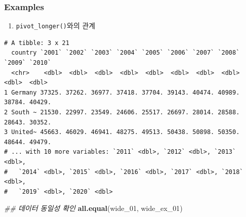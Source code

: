 \documentclass[
  11pt,
]{krantz}
\newenvironment{Shaded}{\begin{snugshade}}{\end{snugshade}}
\newcommand{\CommentTok}[1]{\textcolor[rgb]{0.37,0.37,0.37}{\textit{#1}}}
\newcommand{\DataTypeTok}[1]{\textcolor[rgb]{0.27,0.27,0.27}{#1}}
\newcommand{\DecValTok}[1]{\textcolor[rgb]{0.06,0.06,0.06}{#1}}
\newcommand{\KeywordTok}[1]{\textcolor[rgb]{0.27,0.27,0.27}{\textbf{#1}}}
\newcommand{\NormalTok}[1]{#1}
\newcommand{\OperatorTok}[1]{\textcolor[rgb]{0.43,0.43,0.43}{\textbf{#1}}}
\newcommand{\StringTok}[1]{\textcolor[rgb]{0.5,0.5,0.5}{#1}}
\providecommand{\tightlist}{%
  \setlength{\itemsep}{0pt}\setlength{\parskip}{0pt}}
\begin{document}
\normalsize

\hypertarget{wide-format-ex}{%
\subsubsection*{\texorpdfstring{\textbf{Examples}}{Examples}}\label{wide-format-ex}}


\begin{enumerate}
\def\labelenumi{\arabic{enumi}.}
\tightlist
\item
  \texttt{pivot\_longer()}와의 관계
\end{enumerate}

\footnotesize

\begin{Shaded}
\end{Shaded}

\begin{verbatim}
# A tibble: 3 x 21
  country `2001` `2002` `2003` `2004` `2005` `2006` `2007` `2008` `2009` `2010`
  <chr>    <dbl>  <dbl>  <dbl>  <dbl>  <dbl>  <dbl>  <dbl>  <dbl>  <dbl>  <dbl>
1 Germany 37325. 37262. 36977. 37418. 37704. 39143. 40474. 40989. 38784. 40429.
2 South ~ 21530. 22997. 23549. 24606. 25517. 26697. 28014. 28588. 28643. 30352.
3 United~ 45663. 46029. 46941. 48275. 49513. 50438. 50898. 50350. 48644. 49479.
# ... with 10 more variables: `2011` <dbl>, `2012` <dbl>, `2013` <dbl>,
#   `2014` <dbl>, `2015` <dbl>, `2016` <dbl>, `2017` <dbl>, `2018` <dbl>,
#   `2019` <dbl>, `2020` <dbl>
\end{verbatim}

\begin{Shaded}
\begin{Highlighting}[]
\CommentTok{## 데이터 동일성 확인}
\KeywordTok{all.equal}\NormalTok{(wide_}\DecValTok{01}\NormalTok{, wide_ex_}\DecValTok{01}\NormalTok{)}
\end{Highlighting}
\end{Shaded}
\end{document}
